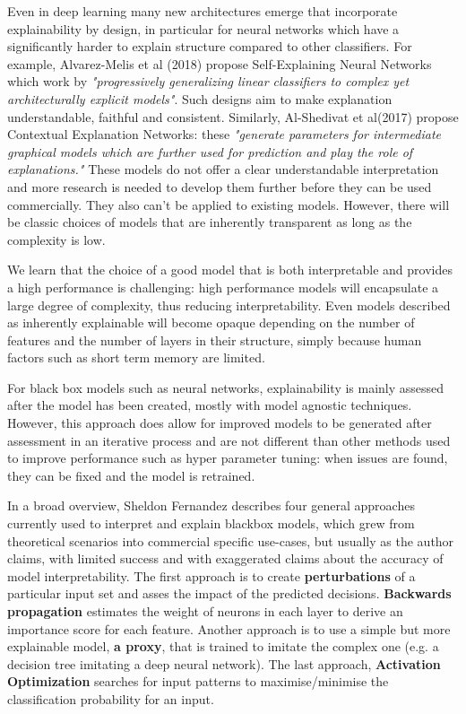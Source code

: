 \documentclass[proposal]{softeng}
\begin{document}
Even in deep learning many new architectures emerge that incorporate explainability by design, in particular for neural networks which have a significantly harder to explain structure compared to other classifiers. For example, Alvarez-Melis et al (2018)\cite{alvarezmelis2018robust} propose Self-Explaining Neural Networks which work by \textit{"progressively generalizing linear classifiers to complex yet architecturally explicit models"}. Such designs aim to make explanation understandable, faithful and consistent. Similarly, Al-Shedivat et al(2017)\cite{alshedivat2017contextual} propose Contextual Explanation Networks: these \textit{"generate parameters for intermediate graphical models which are further used for prediction and play the role of explanations."} These models do not offer a clear understandable interpretation and more research is needed to develop them further before they can be used commercially. They also can't be applied to existing models. However, there will be classic choices of models that are inherently transparent as long as the complexity is low. 

We learn that the choice of a good model that is both interpretable and provides a high performance is challenging: high performance models will encapsulate a large degree of complexity, thus reducing interpretability. Even models described as inherently explainable will become opaque depending on the number of features and the number of layers in their structure, simply because human factors such as short term memory are limited.

For black box models such as neural networks, explainability is mainly assessed after the model has been created, mostly with model agnostic techniques. However, this approach does allow for improved models to be generated after assessment in an iterative process and are not different than other methods used to improve performance such as hyper parameter tuning: when issues are found, they can be fixed and the model is retrained.

In a broad overview, Sheldon Fernandez \cite{fernandez-dark-ai} describes four general approaches currently used to interpret and explain blackbox models, which grew from theoretical scenarios into commercial specific use-cases, but usually as the author claims, with limited success and with exaggerated claims about the accuracy of model interpretability. The first approach is to create \textbf{perturbations} of a particular input set and asses the impact of the predicted decisions. \textbf{Backwards propagation} estimates the weight of neurons in each layer to derive an importance score for each feature. Another approach is to use a simple but more explainable model, \textbf{a proxy}, that is trained to imitate the complex one (e.g. a decision tree imitating a deep neural network). The last approach, \textbf{Activation Optimization} searches for input patterns to maximise/minimise the classification probability for an input.  
\end{document}
